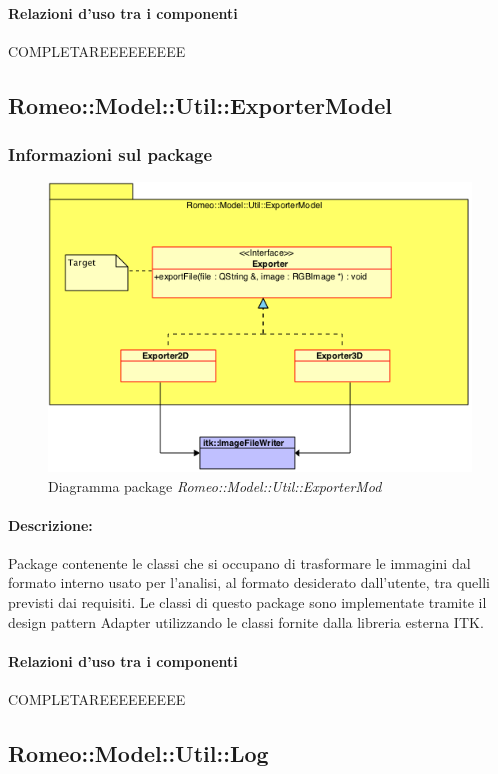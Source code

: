 			\paragraph{Relazioni d'uso tra i componenti}
COMPLETAREEEEEEEEE	\subsection{Romeo::Model::Util::ExporterModel}
		\subsubsection{Informazioni sul package}
			\begin{figure}[!h]
				\centering
				\includegraphics[scale=0.5]{./Content/Immagini/ExporterModel.png}
				\caption{Diagramma package \textsl{Romeo::Model::Util::ExporterMod}}
			\end{figure}
			\paragraph{Descrizione:}Package\g{} contenente le classi che si occupano di trasformare le immagini dal formato interno usato per l'analisi, al formato desiderato dall'utente, tra quelli previsti dai requisiti. Le classi di questo package\g{} sono implementate tramite il design pattern\g{} Adapter utilizzando le classi fornite dalla libreria esterna ITK\g{}.
			\paragraph{Relazioni d'uso tra i componenti}
COMPLETAREEEEEEEEE	\subsection{Romeo::Model::Util::Log}

